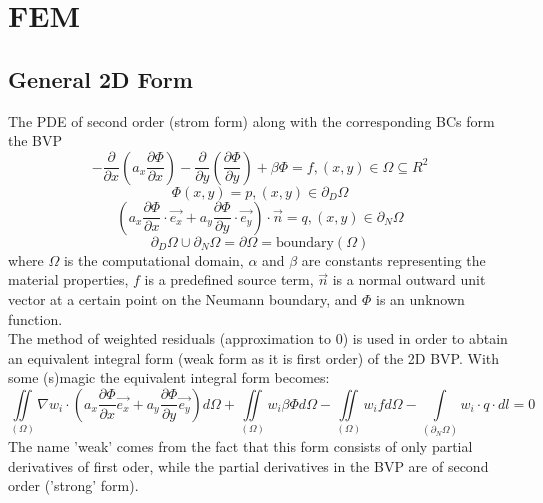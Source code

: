 \section{FEM}

\subsection{General 2D Form}
The PDE of second order (strom form) along with the corresponding BCs form the BVP
\begin{equation*}
	-\frac{\partial }{\partial x}\left(a_x \frac{\partial \Phi}{\partial x}\right) - \frac{\partial }{\partial y}\left(\frac{\partial \Phi}{\partial y}\right) + \beta \Phi = f, (x,y) \in \Omega \subseteq R^2
\end{equation*}
\begin{equation*}
	\Phi(x,y) = p, (x,y) \in \partial_D\Omega
\end{equation*}
\begin{equation*}
	\left(a_x \frac{\partial \Phi}{\partial x}\cdot \vec{e_x} + a_y \frac{\partial \Phi}{\partial y} \cdot \vec{e_y}\right) \cdot \vec{n} = q, (x,y) \in \partial_N\Omega
\end{equation*}
\begin{equation*}
	\partial_D\Omega \cup \partial_N\Omega = \partial\Omega = \textrm{boundary}(\Omega)
\end{equation*}
where $\Omega$ is the computational domain, $\alpha$ and $\beta$ are constants representing the material properties, $f$ is a predefined source term, $\vec{n}$ is a normal outward unit vector at a certain point on the Neumann boundary, and $\Phi$ is an unknown function. \\

The method of weighted residuals (approximation to $0$) is used in order to abtain an equivalent integral form (weak form as it is first order) of the 2D BVP. With some (s)magic the equivalent integral form becomes:
\begin{equation*}
	\iint\limits_{\left(\Omega\right)} \nabla w_i \cdot \left(a_x \frac{\partial \Phi}{\partial x} \vec{e_x} + a_y \frac{\partial \Phi}{\partial y} \vec{e_y}\right) d\Omega + \iint\limits_{\left(\Omega\right)} w_i\beta\Phi d\Omega - \iint\limits_{\left(\Omega\right)} w_i f d\Omega  - \int\limits_{\left(\partial_N\Omega\right)} w_i \cdot q \cdot dl = 0
\end{equation*}
The name 'weak' comes from the fact that this form consists of only partial derivatives of first oder, while the partial derivatives in the BVP are of second order ('strong' form).

